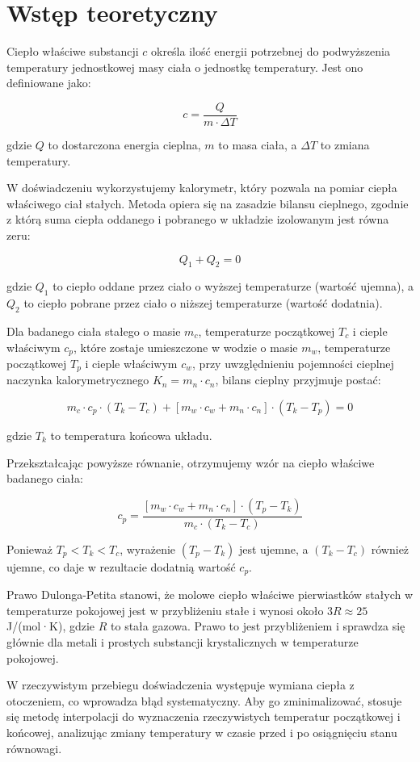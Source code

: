 \documentclass[12pt,a4paper]{article}
\begin{document}
\section{Wstęp teoretyczny}

Ciepło właściwe substancji $c$ określa ilość energii potrzebnej do podwyższenia temperatury jednostkowej masy ciała o jednostkę temperatury. Jest ono definiowane jako:

\begin{equation}
    c = \frac{Q}{m \cdot \Delta T}
\end{equation}

gdzie $Q$ to dostarczona energia cieplna, $m$ to masa ciała, a $\Delta T$ to zmiana temperatury.

W doświadczeniu wykorzystujemy kalorymetr, który pozwala na pomiar ciepła właściwego ciał stałych. Metoda opiera się na zasadzie bilansu cieplnego, zgodnie z którą suma ciepła oddanego i pobranego w układzie izolowanym jest równa zeru:

\begin{equation}
    Q_1 + Q_2 = 0
\end{equation}

gdzie $Q_1$ to ciepło oddane przez ciało o wyższej temperaturze (wartość ujemna), a $Q_2$ to ciepło pobrane przez ciało o niższej temperaturze (wartość dodatnia).

Dla badanego ciała stałego o masie $m_c$, temperaturze początkowej $T_c$ i cieple właściwym $c_p$, które zostaje umieszczone w wodzie o masie $m_w$, temperaturze początkowej $T_p$ i cieple właściwym $c_w$, przy uwzględnieniu pojemności cieplnej naczynka kalorymetrycznego $K_n = m_n \cdot c_n$, bilans cieplny przyjmuje postać:

\begin{equation}
    m_c \cdot c_p \cdot (T_k - T_c) + [m_w \cdot c_w + m_n \cdot c_n] \cdot (T_k - T_p) = 0
\end{equation}

gdzie $T_k$ to temperatura końcowa układu.

Przekształcając powyższe równanie, otrzymujemy wzór na ciepło właściwe badanego ciała:

\begin{equation}
    c_p = \frac{[m_w \cdot c_w + m_n \cdot c_n] \cdot (T_p - T_k)}{m_c \cdot (T_k - T_c)}
\end{equation}

Ponieważ $T_p < T_k < T_c$, wyrażenie $(T_p - T_k)$ jest ujemne, a $(T_k - T_c)$ również ujemne, co daje w rezultacie dodatnią wartość $c_p$.

Prawo Dulonga-Petita stanowi, że molowe ciepło właściwe pierwiastków stałych w temperaturze pokojowej jest w przybliżeniu stałe i wynosi około $3R \approx 25$ J/(mol·K), gdzie $R$ to stała gazowa. Prawo to jest przybliżeniem i sprawdza się głównie dla metali i prostych substancji krystalicznych w temperaturze pokojowej.

W rzeczywistym przebiegu doświadczenia występuje wymiana ciepła z otoczeniem, co wprowadza błąd systematyczny. Aby go zminimalizować, stosuje się metodę interpolacji do wyznaczenia rzeczywistych temperatur początkowej i końcowej, analizując zmiany temperatury w czasie przed i po osiągnięciu stanu równowagi.
\end{document}
